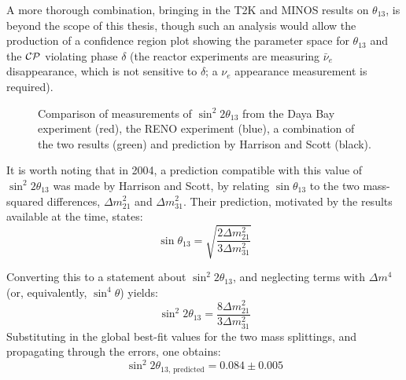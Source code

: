 A more thorough combination, bringing in the T2K and MINOS results on $\theta_{13}$, is beyond the scope of this thesis, though such an analysis would allow the production of a confidence region plot showing the parameter space for $\theta_{13}$ and the $\mathcal{C}\mathcal{P}$ violating phase $\delta$ (the reactor experiments are measuring $\bar{\nu}_e$ disappearance, which is not sensitive to $\delta$; a $\nu_e$ appearance measurement is required).

\begin{figure}
\centering
{}
\caption[Comparison of measurements of $\sin^2 2\theta_{13}$]{\label{fig:theta-13_results}Comparison of measurements of $\sin^2 2\theta_{13}$ from the Daya Bay experiment (red), the RENO experiment (blue), a combination of the two results (green) and prediction by Harrison and Scott (black).}
\end{figure}

It is worth noting that in 2004, a prediction compatible with this value of $\sin^2 2\theta_{13}$ was made by Harrison and Scott, by relating $\sin\theta_{13}$ to the two mass-squared differences, $\Delta m^2_{21}$ and $\Delta m^2_{31}$\citep{Harrison2004}. Their prediction, motivated by the results available at the time, states:
\begin{equation}\label{eqn:theta_13_prediction}
\sin \theta_{13} = \sqrt{\frac{2\Delta m^2_{21}}{3\Delta m^2_{31}}}
\end{equation}

Converting this to a statement about $\sin^2 2\theta_{13}$, and neglecting terms with $\Delta m^4$ (or, equivalently, $\sin^4 \theta$) yields:
\begin{equation}\label{eqn:sin2_2theta_13_prediction}
\sin^2 2\theta_{13} = \frac{8 \Delta m^2_{21}}{3 \Delta m^2_{31}}
\end{equation}
Substituting in the global best-fit values for the two mass splittings, and propagating through the errors, one obtains:
\begin{equation}\label{eqn:prediction_sin2_2theta_13}
\sin^2 2\theta_{13,\,\mathrm{predicted}} = 0.084 \pm 0.005
\end{equation}

